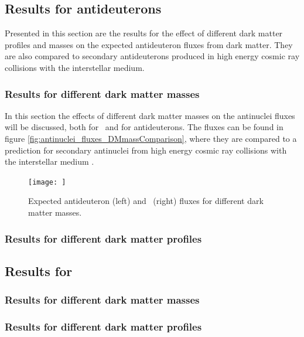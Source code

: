 \subsection{Results for antideuterons}
Presented in this section are the results for the effect of different dark matter profiles and masses on the expected antideuteron fluxes from dark matter. They are also compared to secondary antideuterons produced in high energy cosmic ray collisions with the interstellar medium. 

\subsubsection{Results for different dark matter masses}
In this section the effects of different dark matter masses on the antinuclei fluxes will be discussed, both for \ahe\ and for antideuterons. The fluxes can be found in figure \ref{fig:antinuclei_fluxes_DMmassComparison}, where they are compared to a prediction for secondary antinuclei from high energy cosmic ray collisions with the interstellar medium . 

\begin{figure}
    \centering
    \texttt{[image: ]}
    \caption{Expected antideuteron (left) and \ahe\ (right) fluxes for different dark matter masses.}
    \label{fig:dbar_fluxes_DMmassComparison}
\end{figure}
\subsubsection{Results for different dark matter profiles}
\subsection{Results for \ahe}
\subsubsection{Results for different dark matter masses}
\subsubsection{Results for different dark matter profiles}\label{sec:ResDMProfiles}
